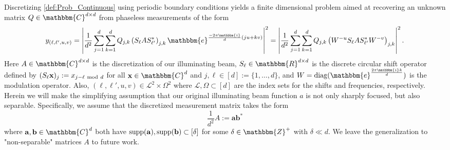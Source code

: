 \documentclass[]{spie}  %
\def \a {\mathbf a}
\def \b {\mathbf b}
\def \x {\mathbf x}
\def \e { \mathbbm{e}}
\def \i { \mathbbm{i}}
\def \diag {{\rm diag}}
\def \supp {{\rm supp}}
\begin{document}
Discretizing \eqref{def:Prob_Continuous} using periodic boundary conditions yields a finite dimensional problem aimed at recovering an unknown matrix $Q \in \mathbbm{C}^{d \times d}$ from phaseless measurements of the form
\begin{equation}
y_{(\ell, \ell', u, v)} = \left| \frac{1}{d^2} \sum^d_{j=1} \sum^d_{k=1} Q_{j,k} \left(S_{\ell}AS^*_{\ell'}\right)_{j,k} \e^{\frac{-2\pi \i}{d}(ju + kv)} \right|^2 = \left| \frac{1}{d^2} \sum_{j=1}^d \sum_{k=1}^d Q_{j,k}\left(W^{-u} S_{\ell}AS^*_{\ell'}W^{-v}\right)_{j,k} \right|^2.
\label{def:Prob_Disc_Gen}
\end{equation}
Here $A \in \mathbbm{C}^{d \times d}$ is the discretization of our illuminating beam, $S_\ell \in \mathbbm{R}^{d \times d}$ is the discrete circular shift operator defined by $(S_\ell \x)_j := x_{j-\ell ~{\rm mod}~ d}$ for all $\x \in \mathbbm{C}^d$ and $j,\ell \in [d] := \{ 1, \dots, d\}$, and $W = \diag(\e^{\frac{2 \pi \i k}{d}})$ is the modulation operator.  Also, $(\ell, \ell', u, v) \in \mathcal{L}^2 \times \Omega^2$ where $\mathcal{L}, \Omega \subset [d]$ are the index sets for the shifts and frequencies, respectively.  Herein we will make the simplifying assumption that our original illuminating beam function $a$ is not only sharply focused, but also separable.  Specifically, we assume that the discretized measurement matrix takes the form $$\frac{1}{d^2} A := \a \b^*$$ where $\a,\b \in \mathbbm{C}^d$ both have $\supp(\a), \supp(\b) \subset [\delta]$ for some $\delta \in \mathbbm{Z}^+$ with $\delta \ll d$. We leave the generalization to "non-separable" matrices $A$ to future work. 
\end{document}
